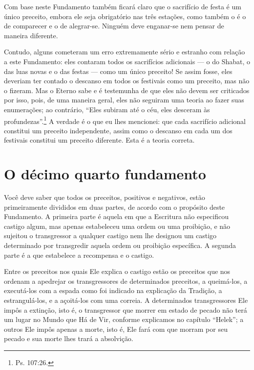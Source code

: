 Com base neste Fundamento também ficará claro que o sacrifício de festa
é um único preceito, embora ele seja obrigatório nas três estações,
como também o é o de comparecer e o de alegrar-se. Ninguém deve
enganar-se nem pensar de maneira diferente.

Contudo, alguns cometeram um erro extremamente sério e estranho com
relação a este Fundamento: eles contaram todos os sacrifícios adicionais
--- o do Shabat, o das luas novas e o das festas --- como um único
preceito! Se assim fosse, eles deveriam ter contado o descanso em todos
os festivais como um preceito, mas não o fizeram. Mas o Eterno sabe e é
testemunha de que eles não devem ser criticados por isso, pois, de uma
maneira geral, eles não seguiram uma teoria ao fazer suas enumerações;
ao contrário, ``Eles subiram até o céu, eles desceram às profundezas''.\footnote{Ps. 107:26.} A verdade é o que eu lhes mencionei: que cada sacrifício
adicional constitui um preceito independente, assim como o descanso em
cada um dos festivais constitui um preceito diferente. Esta é a teoria
correta.

\chapter*{O décimo quarto fundamento}

Você deve saber que todos os preceitos, positivos e negativos, estão
primeiramente divididos em duas partes, de acordo com o propósito deste
Fundamento. A primeira parte é aquela em que a Escritura não
especificou castigo algum, mas apenas estabeleceu uma ordem ou uma
proibição, e não sujeitou o transgressor a qualquer castigo nem lhe
designou um castigo determinado por transgredir aquela ordem ou
proibição específica. A segunda parte é a que estabelece a recompensa e
o castigo.

Entre os preceitos nos quais Ele explica o castigo estão os preceitos
que nos ordenam a apedrejar os transgressores de determinados preceitos,
a queimá-los, a executá-los com a espada como foi indicado na explicação
da Tradição, a estrangulá-los, e a açoitá-los com uma correia. A
determinados transgressores Ele impôs a extinção, isto é, o
transgressor que morrer em estado de pecado não terá um lugar no Mundo
que Há de Vir, conforme explicamos no capítulo ``Helek''; a outros Ele
impôs apenas a morte, isto é, Ele fará com que morram por seu pecado e
sua morte lhes trará a absolvição.

